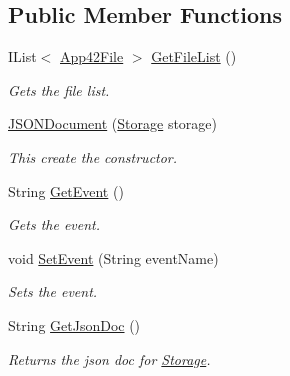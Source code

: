 \subsection*{Public Member Functions}
\begin{DoxyCompactItemize}
\item 
I\+List$<$ \hyperlink{classcom_1_1shephertz_1_1app42_1_1paas_1_1sdk_1_1csharp_1_1_app42_file}{App42\+File} $>$ \hyperlink{classcom_1_1shephertz_1_1app42_1_1paas_1_1sdk_1_1csharp_1_1storage_1_1_storage_1_1_j_s_o_n_document_a23fe1a1d6737176a49c7609b4f57e9be}{Get\+File\+List} ()
\begin{DoxyCompactList}\small\item\em Gets the file list. \end{DoxyCompactList}\item 
\hyperlink{classcom_1_1shephertz_1_1app42_1_1paas_1_1sdk_1_1csharp_1_1storage_1_1_storage_1_1_j_s_o_n_document_aa00441bb618ae2c11535c563a35ed1af}{J\+S\+O\+N\+Document} (\hyperlink{classcom_1_1shephertz_1_1app42_1_1paas_1_1sdk_1_1csharp_1_1storage_1_1_storage}{Storage} storage)
\begin{DoxyCompactList}\small\item\em This create the constructor. \end{DoxyCompactList}\item 
String \hyperlink{classcom_1_1shephertz_1_1app42_1_1paas_1_1sdk_1_1csharp_1_1storage_1_1_storage_1_1_j_s_o_n_document_ad357bb7e38333a9fe6bd2e328522a023}{Get\+Event} ()
\begin{DoxyCompactList}\small\item\em Gets the event. \end{DoxyCompactList}\item 
void \hyperlink{classcom_1_1shephertz_1_1app42_1_1paas_1_1sdk_1_1csharp_1_1storage_1_1_storage_1_1_j_s_o_n_document_a55cd21e91143f3d74572824e2112cd2a}{Set\+Event} (String event\+Name)
\begin{DoxyCompactList}\small\item\em Sets the event. \end{DoxyCompactList}\item 
String \hyperlink{classcom_1_1shephertz_1_1app42_1_1paas_1_1sdk_1_1csharp_1_1storage_1_1_storage_1_1_j_s_o_n_document_a980d162916c7ebef6cd0abf235ad7517}{Get\+Json\+Doc} ()
\begin{DoxyCompactList}\small\item\em Returns the json doc for \hyperlink{classcom_1_1shephertz_1_1app42_1_1paas_1_1sdk_1_1csharp_1_1storage_1_1_storage}{Storage}. \end{DoxyCompactList}\item 

\end{DoxyCompactItemize}
